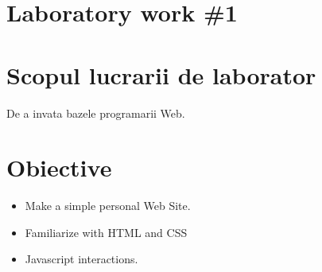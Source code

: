 \section*{Laboratory work \#1}

\section{Scopul lucrarii de laborator}
De a invata bazele programarii Web.
\section{Obiective}

\begin{itemize}
	\item Make a simple personal Web Site.
	\item Familiarize with HTML and CSS
	\item Javascript interactions.
\end{itemize}

\clearpage